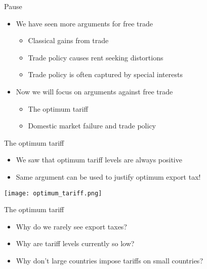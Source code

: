 \documentclass{beamer}
\begin{document}
\begin{frame}{Pause}
    \begin{itemize}
        \item We have seen more arguments for free trade
        \begin{itemize}
            \item Classical gains from trade
            \item Trade policy causes rent seeking distortions
            \item Trade policy is often captured by special interests
        \end{itemize}
        \item Now we will focus on arguments against free trade
        \begin{itemize}
            \item The optimum tariff
            \item Domestic market failure and trade policy
        \end{itemize}
    \end{itemize}
\end{frame}

\begin{frame}{The optimum tariff}
    \begin{itemize}
        \item We saw that optimum tariff levels are always positive
        \item Same argument can be used to justify optimum export tax!
    \end{itemize}
    \texttt{[image: optimum\_tariff.png]}
\end{frame}


\begin{frame}{The optimum tariff}
    \begin{itemize}
        \item Why do we rarely see export taxes?
        \item Why are tariff levels currently so low?
        \item Why don't large countries impose tariffs on small countries?
    \end{itemize}
\end{frame}
\end{document}
